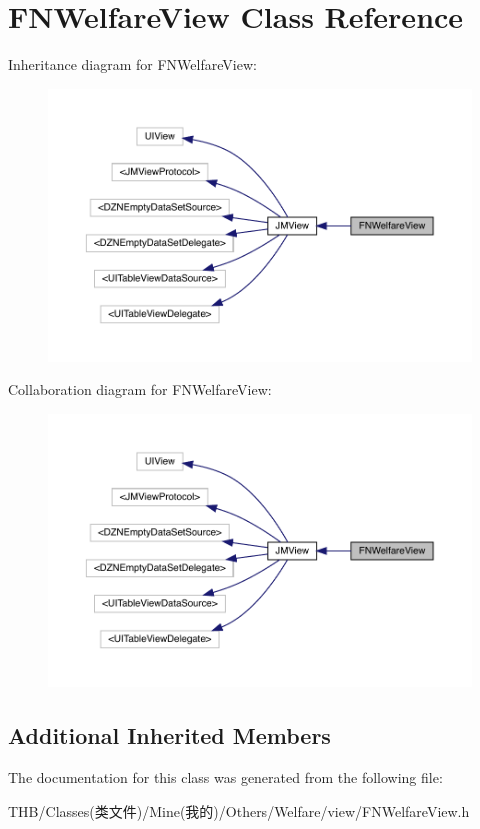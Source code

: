 \hypertarget{interface_f_n_welfare_view}{}\section{F\+N\+Welfare\+View Class Reference}
\label{interface_f_n_welfare_view}


Inheritance diagram for F\+N\+Welfare\+View\+:\nopagebreak
\begin{figure}[H]
\begin{center}
\leavevmode
\includegraphics[width=350pt]{interface_f_n_welfare_view__inherit__graph}
\end{center}
\end{figure}


Collaboration diagram for F\+N\+Welfare\+View\+:\nopagebreak
\begin{figure}[H]
\begin{center}
\leavevmode
\includegraphics[width=350pt]{interface_f_n_welfare_view__coll__graph}
\end{center}
\end{figure}
\subsection*{Additional Inherited Members}


The documentation for this class was generated from the following file\+:\begin{DoxyCompactItemize}
\item 
T\+H\+B/\+Classes(类文件)/\+Mine(我的)/\+Others/\+Welfare/view/F\+N\+Welfare\+View.\+h\end{DoxyCompactItemize}
